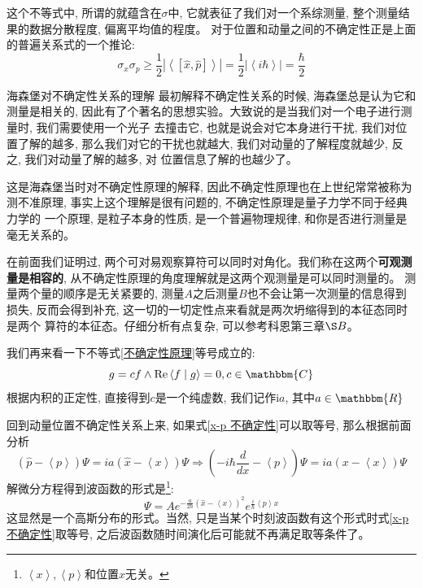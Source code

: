 \documentclass[a4paper,zihao=-4,linespread=1]{ctexrep}
\begin{document}
    这个不等式中, 所谓的就蕴含在$\sigma$中, 它就表征了我们对一个系综测量, 整个测量结果的数据分散程度, 偏离平均值的程度。
    对于位置和动量之间的不确定性正是上面的普遍关系式的一个推论:
    \begin{equation}
        \label{x-p 不确定性}
        {\sigma _x}{\sigma _p} \geqslant \frac{1}{2}\left| {\left\langle {\left[ {\hat x,\hat p} \right]} \right\rangle } \right| = \frac{1}{2}\left| {\left\langle {i\hbar } \right\rangle } \right| = \frac{\hbar }{2}
    \end{equation}
    \begin{history}{海森堡对不确定性关系的理解}
        \setlength\parindent{2em}最初解释不确定性关系的时候, 海森堡总是认为它和测量是相关的, 因此有了个著名的思想实验。大致说的是当我们对一个电子进行测量时, 我们需要使用一个光子
        去撞击它, 也就是说会对它本身进行干扰, 我们对位置了解的越多, 那么我们对它的干扰也就越大, 我们对动量的了解程度就越少, 反之, 我们对动量了解的越多, 对
        位置信息了解的也越少了。
        
        \setlength\parindent{2em}这是海森堡当时对不确定性原理的解释, 因此不确定性原理也在上世纪常常被称为测不准原理, 事实上这个理解是很有问题的, 不确定性原理是量子力学不同于经典力学的
        一个原理, 是粒子本身的性质, 是一个普遍物理规律, 和你是否进行测量是毫无关系的。
    \end{history}
    在前面我们证明过, 两个可对易观察算符可以同时对角化。我们称在这两个\textbf{可观测量是相容的}, 从不确定性原理的角度理解就是这两个观测量是可以同时测量的。
    测量两个量的顺序是无关紧要的, 测量$A$之后测量$B$也不会让第一次测量的信息得到损失, 反而会得到补充, 这一切的一切定性点来看就是两次坍缩得到的本征态同时是两个
    算符的本征态。仔细分析有点复杂, 可以参考科恩第三章$\S B$。

    我们再来看一下不等式\ref{不确定性原理}等号成立的:
    \[g = cf \wedge \operatorname{Re} \left\langle {f}\mathrel{\left | {\vphantom {f g}}\right. \kern-\nulldelimiterspace}{g} \right\rangle  = 0,c\in \mathbbm{C}\]
    根据内积的正定性, 直接得到$c$是一个纯虚数, 我们记作$\mathrm{i}a$, 其中$a\in\mathbbm{R}$

    回到动量位置不确定性关系上来, 如果式\ref{x-p 不确定性}可以取等号, 那么根据前面分析
    \[\left( {\hat p - \left\langle p \right\rangle } \right)\Psi  = ia\left( {\hat x - \left\langle x \right\rangle } \right)\Psi  \Rightarrow \left( { - i\hbar \frac{d}{{dx}} - \left\langle p \right\rangle } \right)\Psi  = ia\left( {x - \left\langle x \right\rangle } \right)\Psi \]
    解微分方程得到波函数的形式是\footnote{$\left\langle x \right\rangle,\left\langle p \right\rangle$和位置$x$无关。}:
    \begin{equation}
        \Psi  = A{e^{ - \frac{a}{{2\hbar }}{{\left( {\hat x - \left\langle x \right\rangle } \right)}^2}}}{e^{\frac{i}{\hbar }\left\langle p \right\rangle x}}
    \end{equation}
    这显然是一个高斯分布的形式。当然, 只是当某个时刻波函数有这个形式时式\ref{x-p 不确定性}取等号, 之后波函数随时间演化后可能就不再满足取等条件了。
\end{document}
